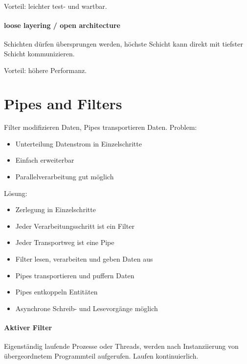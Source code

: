 Vorteil: leichter test- und wartbar.

\paragraph{loose layering / open
architecture}\label{loose-layering-open-architecture}

Schichten dürfen übersprungen werden, höchste Schicht kann direkt mit
tiefster Schicht kommunizieren.

Vorteil: höhere Performanz.

\section{Pipes and Filters}\label{pipes-and-filters}

Filter modifizieren Daten, Pipes transportieren Daten. Problem:

\begin{itemize}
\itemsep1pt\parskip0pt
\item
  Unterteilung Datenstrom in Einzelschritte
\item
  Einfach erweiterbar
\item
  Parallelverarbeitung gut möglich
\end{itemize}

Lösung:

\begin{itemize}
\itemsep1pt\parskip0pt
\item
  Zerlegung in Einzelschritte
\item
  Jeder Verarbeitungsschritt ist ein Filter
\item
  Jeder Transportweg ist eine Pipe
\item
  Filter lesen, verarbeiten und geben Daten aus
\item
  Pipes transportieren und puffern Daten
\item
  Pipes entkoppeln Entitäten
\item
  Asynchrone Schreib- und Lesevorgänge möglich
\end{itemize}

\paragraph{Aktiver Filter}\label{aktiver-filter}

Eigenständig laufende Prozesse oder Threads, werden nach Instanziierung
von übergeordnetem Programmteil aufgerufen. Laufen kontinuierlich.

